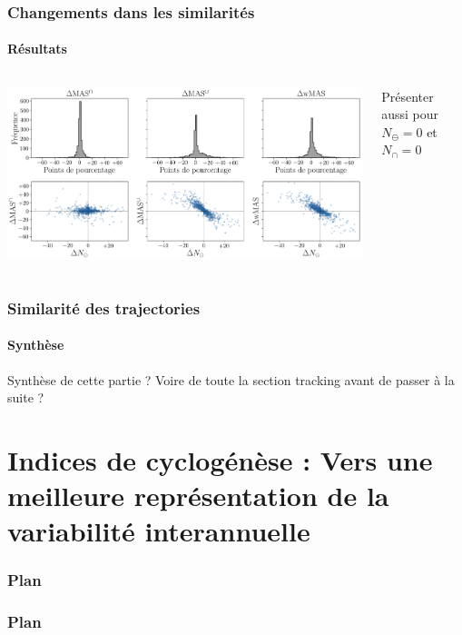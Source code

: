 \documentclass[aspectratio=169, usepdftitle=false, xcolor={dvipsnames}, 9pt,table]{beamer}
\begin{document}
\begin{frame}[c]
    \frametitle{Changements dans les similarités}
    \framesubtitle{Résultats}
    \begin{columns}
        \begin{column}{0.7\textwidth}
            \begin{center}
                \includegraphics[width=\textwidth]{Figures/delta_MAS.png}
            \end{center}
        \end{column}
        \begin{column}{0.3\textwidth}
            Présenter aussi pour $N_\ominus = 0$ et $N_\cap = 0$
        \end{column}
    \end{columns}
\end{frame}

\begin{frame}
    \frametitle{Similarité des trajectories}
    \framesubtitle{Synthèse}
        Synthèse de cette partie ? Voire de toute la section tracking avant de passer à la suite ?
\end{frame}

\section[Indices de cyclogénèse]{Indices de cyclogénèse : Vers une meilleure représentation de la variabilité interannuelle}
\begin{frame}[c]
    \frametitle{Plan}
    \addtocounter{framesinsection}{-1}
    \tableofcontents[currentsection,hideallsubsections,sections={1-3}]
    \vspace{-3em}
    \tableofcontents[hideallsubsections,sections={4-}]
\end{frame}
%
\begin{frame}[c]
    \frametitle{Plan}
    \addtocounter{framesinsection}{-1}
\end{frame}
\end{document}
